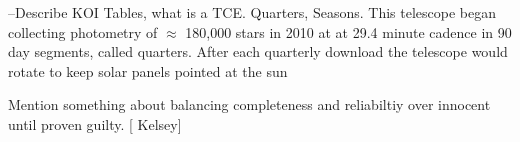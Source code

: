  



--Describe KOI Tables, what is a TCE.  Quarters, Seasons.
This telescope began collecting photometry of $\approx$ 180,000 stars in 2010 at at 29.4 minute cadence in 90 day segments, called quarters. After each quarterly download the telescope would rotate to keep solar panels pointed at the sun

Mention something about balancing completeness and reliabiltiy over innocent until proven guilty. [ Kelsey]




